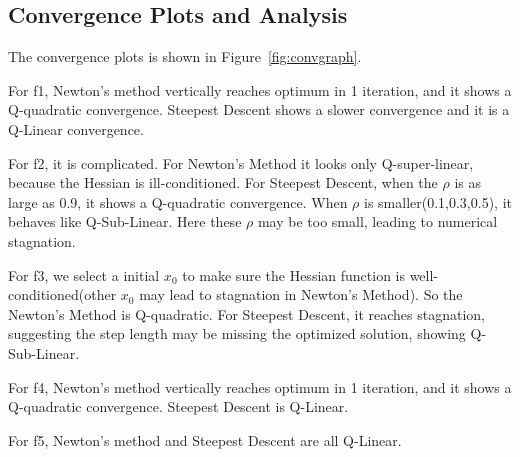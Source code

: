 \documentclass[12pt]{article}
\begin{document}
\subsection{Convergence Plots and Analysis}

The convergence plots is shown in Figure~\ref{fig:convgraph}. 

For f1, Newton's method vertically reaches optimum in 1 iteration, and it shows a Q-quadratic convergence. Steepest Descent  shows a slower convergence and it is a Q-Linear convergence.

For f2, it is complicated. For Newton’s Method it looks only Q-super-linear, because the Hessian is ill-conditioned. For Steepest Descent, when the $\rho$ is as large as 0.9, it shows a Q-quadratic convergence. When $\rho$ is smaller(0.1,0.3,0.5), it behaves like Q-Sub-Linear. Here these $\rho$ may be too small, leading to numerical stagnation.

For f3, we select a initial $x_0$ to make sure the Hessian function is well-conditioned(other $x_0$ may lead to stagnation in Newton's Method). So the Newton's Method is Q-quadratic. For Steepest Descent, it reaches stagnation, suggesting the step length may be missing the optimized solution, showing Q-Sub-Linear.

For f4, Newton's method vertically reaches optimum in 1 iteration, and it shows a Q-quadratic convergence. Steepest Descent is Q-Linear.

For f5, Newton's method and Steepest Descent are all Q-Linear.
\end{document}
